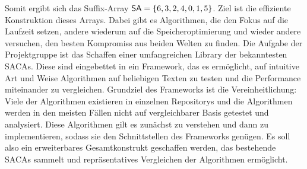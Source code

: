 %
Somit ergibt sich das Suffix-Array $\sa = \{ 6,3,2,4,0,1,5 \}$.
Ziel ist die effiziente Konstruktion dieses Arrays.
Dabei gibt es Algorithmen, die den Fokus auf die Laufzeit setzen,
andere wiederum auf die Speicheroptimierung und wieder andere versuchen, den besten Kompromiss aus beiden Welten zu finden.
Die Aufgabe der Projektgruppe ist das Schaffen einer umfangreichen Library der bekanntesten SACAs.
Diese sind eingebettet in ein Framework, das es ermöglicht, auf intuitive Art und Weise Algorithmen auf beliebigen
Texten zu testen und die Performance miteinander zu vergleichen.
Grundziel des Frameworks ist die Vereinheitlichung:
Viele der Algorithmen existieren in einzelnen Repositorys und die Algorithmen werden in den meisten Fällen 
nicht auf vergleichbarer Basis getestet und analysiert.
Diese Algorithmen gilt es zunächst zu verstehen
und dann zu implementieren, sodass sie den Schnittstellen des Frameworks genügen.
Es soll also ein erweiterbares Gesamtkonstrukt geschaffen werden, das bestehende SACAs
sammelt und repräsentatives Vergleichen der Algorithmen ermöglicht.


